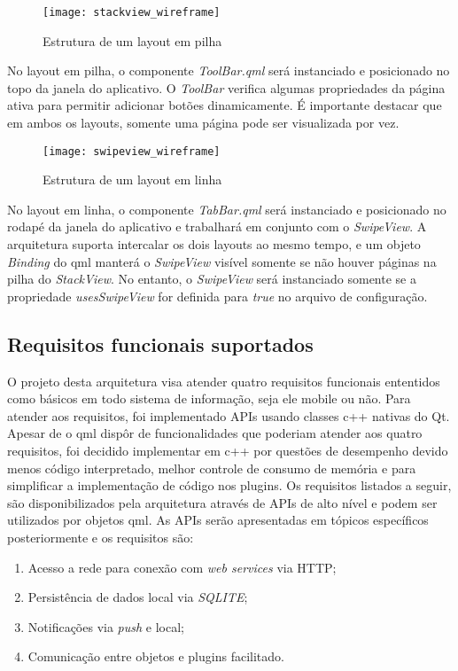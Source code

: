 \begin{figure}[H]
	\texttt{[image: stackview\_wireframe]}
	\centering
	\caption{Estrutura de um layout em pilha}
\end{figure}

No layout em pilha, o componente \textit{ToolBar.qml} será instanciado e posicionado no topo da janela do aplicativo. O \textit{ToolBar} verifica algumas propriedades da página ativa para permitir adicionar botões dinamicamente. É importante destacar que em ambos os layouts, somente uma página pode ser visualizada por vez.

\begin{figure}[H]
	\texttt{[image: swipeview\_wireframe]}
	\centering
	\caption{Estrutura de um layout em linha}
\end{figure}

No layout em linha, o componente \textit{TabBar.qml} será instanciado e posicionado no rodapé da janela do aplicativo e trabalhará em conjunto com o \textit{SwipeView}. A arquitetura suporta intercalar os dois layouts ao mesmo tempo, e um objeto \textit{Binding} do qml manterá o \textit{SwipeView} visível somente se não houver páginas na pilha do \textit{StackView}. No entanto, o \textit{SwipeView} será instanciado somente se a propriedade \textit{usesSwipeView} for definida para \textit{true} no arquivo de configuração.\par


\subsection{Requisitos funcionais suportados}
O projeto desta arquitetura visa atender quatro requisitos funcionais ententidos como básicos em todo sistema de informação, seja ele mobile ou não. Para atender aos requisitos, foi implementado APIs usando classes c++ nativas do Qt. Apesar de o qml dispôr de funcionalidades que poderiam atender aos quatro requisitos, foi decidido implementar em c++ por questões de desempenho devido menos código interpretado, melhor controle de consumo de memória e para simplificar a implementação de código nos plugins. Os requisitos listados a seguir, são disponibilizados pela arquitetura através de APIs de alto nível e podem ser utilizados por objetos qml. As APIs serão apresentadas em tópicos específicos posteriormente e os requisitos são:

\begin{enumerate}
	\item Acesso a rede para conexão com \textit{web services} via HTTP;
	\item Persistência de dados local via \textit{SQLITE};
	\item Notificações via \textit{push} e local;
	\item Comunicação entre objetos e plugins facilitado.
\end{enumerate}


